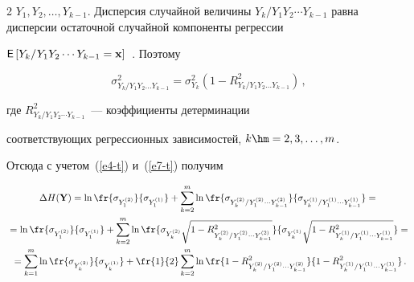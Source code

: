 \begin{multicols}{2}
$Y_1, Y_2,\ldots , Y_{k-1}$. Дисперсия случайной величины $Y_k/Y_1Y_2\cdots 

Y_{k-1}$ равна дисперсии остаточной случайной компоненты регрессии 

${\sf E}\left[ Y_k/Y_1Y_2\cdots Y_{k-1}=\mathbf{x}\right]$~\cite{12-t}. Поэтому

  \begin{equation}

  \sigma^2_{Y_k/Y_1Y_2\ldots Y_{k-1}}=\sigma^2_{Y_k}(1-

R^2_{Y_k/Y_1Y_2\ldots Y_{k-1}})\,,

  \label{e7-t}

  \end{equation}

  где $ R^2_{Y_k/Y_1Y_2\cdots Y_{k-1}}$~--- коэффициенты детерминации 

соответствующих регрессионных зависимостей, $k\hm=2, 3, \ldots , m$.

  

  Отсюда с учетом~(\ref{e4-t}) и~(\ref{e7-t}) получим

  \begin{multline*}

  \Delta H(\mathbf{Y}) =\ln \fr{\sigma_{Y_1^{(2)}}}{\sigma_{Y_1^{(1)}}}+

  \sum\limits_{k=2}^m \ln \fr{\sigma_{Y_k^{(2)}/Y_1^{(2)}\cdots Y_{k-

1}^{(2)}}}{\sigma_{Y_k^{(1)}/Y_1^{(1)}\cdots Y_{k-1}^{(1)}}} = {}\\

{}=

  \ln \fr{\sigma_{Y_1^{(2)}}}{\sigma_{Y_1^{(1)}}}+\sum\limits_{k=2}^m 

  \ln \fr{\sigma_{Y_k^{(2)}}\sqrt{1-R^2_{Y_k^{(2)}/Y_1^{(2)}\cdots 

  Y_{k-1}^{(2)}}}}{\sigma_{Y_k^{(1)}}\sqrt{1-R^2_{Y_k^{(1)}/Y_1^{(1)}\cdots 

Y_{k-1}^{(1)}}}}={}\\

  {}=\sum\limits_{k=1}^m \ln 

\fr{\sigma_{Y_k^{(2)}}}{\sigma_{Y_k^{(1)}}}+\fr{1}{2}\sum\limits_{k=2}^m 

  \ln \fr{1-R^2_{Y_k^{(2)}/Y_1^{(2)}\cdots Y_{k-1}^{(2)}}}{1-

R^2_{Y_k^{(1)}/Y_1^{(1)}\cdots Y_{k-1}^{(1)}}}\,.

  \end{multline*}

  


\end{multicols}

